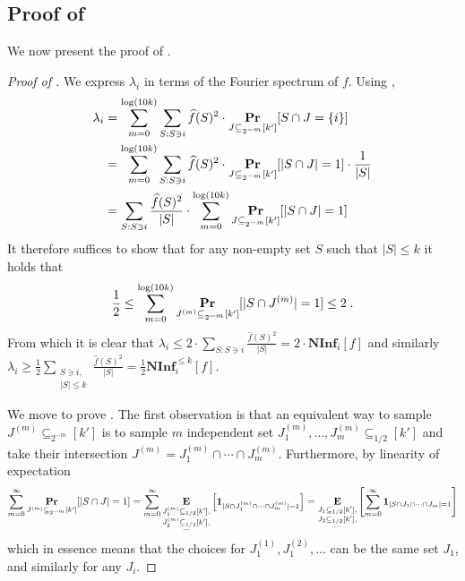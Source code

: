 \documentclass[10pt,a4paper]{article}
\providecommand{\mathbbm}[1]{\mathbf{#1}}
\theoremstyle{plain}
\theoremstyle{remark}
\theoremstyle{plain}
\renewcommand{\Pr}{\mathop{\bf Pr\/}}
\providecommand{\E}{}
\renewcommand{\E}{\mathop{\bf E\/}}
\newcommand\NormInf{{\mathbf{NInf}}}
\renewcommand{\hat}{\widehat}
\begin{document}
\subsection{Proof of }
\label{subsection:proof-of-ninf-ub-lb}
We now present the proof of .
\begin{proof}[Proof of ]
We express $\lambda_i$ in terms of the Fourier spectrum of $f$. Using ,
\begin{align*}\lambda_i &= \sum_{m=0}^{\log(10k)} \sum_{S: S \ni i} \hat{f}(S)^2 \cdot \Pr_{J \subseteq_{2^{-m}} [{k'}]}[ S \cap J = \{i\}]
\\ &= \sum_{m=0}^{\log(10k)} \sum_{S: S \ni i} \hat{f}(S)^2 \cdot \Pr_{J \subseteq_{2^{-m}} [{k'}]}[ |S \cap J| = 1] \cdot \frac{1}{|S|}
\\&=\sum_{S: S \ni i} \frac{\hat{f}(S)^2}{|S|} \cdot \sum_{m=0}^{\log(10k)} \Pr_{J \subseteq_{2^{-m}} [{k'}]}[ |S \cap J| = 1]\end{align*}
It therefore suffices to show that for any non-empty set $S$ such that $|S| \leq k$ it holds that
\begin{equation}\label{eq:1}
\frac{1}{2} \le \sum_{m=0}^{\log(10k)} \Pr_{J^{(m)} \subseteq_{2^{-m}} [{k'}]}[ |S \cap J^{(m)}| = 1] \le 2\;.
\end{equation}
From which it is clear that $\lambda_i \le 2 \cdot \sum_{S: S \ni i} \frac{\hat{f}(S)^2}{|S|}  = 2 \cdot \NormInf_i[f]$ and similarly $\lambda_i \ge \frac{1}{2}\sum_{\substack{ S \ni i,\\ |S|\le k}} \frac{\hat{f}(S)^2}{|S|}  =   \frac{1}{2}\NormInf_i^{\leq k}[f]$.

We move to prove .
The first observation is that an equivalent way to sample $J^{(m)} \subseteq_{2^{-m}}[{k'}]$ is to sample $m$ independent set $J^{(m)}_1, \ldots, J^{(m)}_{m} \subseteq_{1/2}[{k'}]$ and take their intersection $J^{(m)} = J^{(m)}_1 \cap \cdots \cap J^{(m)}_{m}$. Furthermore,  by linearity of expectation
$$\sum_{m=0}^{\infty} \Pr_{J^{(m)} \subseteq_{2^{-m}} [{k'}]}[ |S \cap J| = 1]
= \sum_{m=0}^{\infty}\E_{\substack{J_1^{(m)} \subseteq_{1/2}[{k'}], \\J_2^{(m)} \subseteq_{1/2}[{k'}], \\ \ldots}} \left [ \mathbbm{1}_{|S \cap J_1^{(m)}  \cap \cdots \cap J_m^{(m)}| = 1}\right ]
=\E_{\substack{J_1 \subseteq_{1/2}[{k'}], \\J_2 \subseteq_{1/2}[{k'}], \\\ldots}}\left[ \sum_{m=0}^{\infty} \mathbbm{1}_{|S \cap J_1 \cap \cdots \cap J_m| = 1}\right]$$
which in essence means that the choices for $J_1^{(1)}, J_1^{(2)}, \ldots$ can be the same set $J_1$, and similarly for any $J_i$.



\end{proof}
\end{document}
